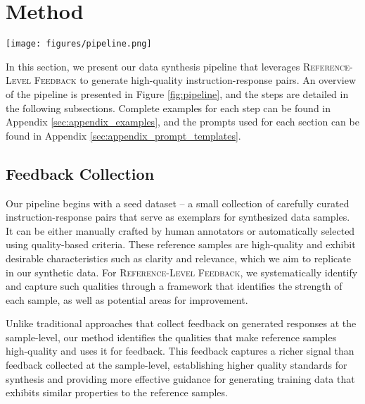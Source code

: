 \section{Method}

\begin{figure*}[t]
    \centering
    \texttt{[image: figures/pipeline.png]} \hfill

    \caption{An overview of our data synthesis pipeline. Starting from our seed data, we select a reference sample and collect \textsc{Reference-Level Feedback} on both the instruction and response. Instruction feedback is used to synthesize new instructions. We generate their corresponding responses, and then improve it using the response feedback.}
    \label{fig:pipeline}
\end{figure*}

In this section, we present our data synthesis pipeline that leverages \textsc{Reference-Level Feedback} to generate high-quality instruction-response pairs. An overview of the pipeline is presented in Figure \ref{fig:pipeline}, and the steps are detailed in the following subsections. Complete examples for each step can be found in Appendix \ref{sec:appendix_examples}, and the prompts used for each section can be found in Appendix \ref{sec:appendix_prompt_templates}.


\subsection{Feedback Collection}

Our pipeline begins with a seed dataset -- a small collection of carefully curated instruction-response pairs that serve as exemplars for synthesized data samples. It can be either manually crafted by human annotators or automatically selected using quality-based criteria. These reference samples are high-quality and exhibit desirable characteristics such as clarity and relevance, which we aim to replicate in our synthetic data. For \textsc{Reference-Level Feedback}, we systematically identify and capture such qualities through a framework that identifies the strength of each sample, as well as potential areas for improvement.

Unlike traditional approaches that collect feedback on generated responses at the sample-level, our method identifies the qualities that make reference samples high-quality and uses it for feedback. This feedback captures a richer signal than feedback collected at the sample-level, establishing higher quality standards for synthesis and providing more effective guidance for generating training data that exhibits similar properties to the reference samples.

